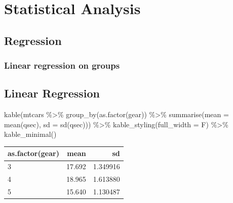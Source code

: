\documentclass[
]{article}
\newenvironment{Shaded}{\begin{snugshade}}{\end{snugshade}}
\newcommand{\AttributeTok}[1]{\textcolor[rgb]{0.77,0.63,0.00}{#1}}
\newcommand{\FunctionTok}[1]{\textcolor[rgb]{0.00,0.00,0.00}{#1}}
\newcommand{\NormalTok}[1]{#1}
\newcommand{\SpecialCharTok}[1]{\textcolor[rgb]{0.00,0.00,0.00}{#1}}
\begin{document}
\hypertarget{statistical-analysis}{%
\section{Statistical Analysis}\label{statistical-analysis}}

\hypertarget{regression}{%
\subsection{Regression}\label{regression}}

\hypertarget{linear-regression-on-groups}{%
\subsubsection{Linear regression on groups}\label{linear-regression-on-groups}}

\hypertarget{linear-regression}{%
\subsection{Linear Regression}\label{linear-regression}}

\begin{Shaded}
\begin{Highlighting}[]
\FunctionTok{kable}\NormalTok{(mtcars }\SpecialCharTok{\%\textgreater{}\%}  \FunctionTok{group\_by}\NormalTok{(}\FunctionTok{as.factor}\NormalTok{(gear)) }\SpecialCharTok{\%\textgreater{}\%}
\FunctionTok{summarise}\NormalTok{(}\AttributeTok{mean =} \FunctionTok{mean}\NormalTok{(qsec), }\AttributeTok{sd =} \FunctionTok{sd}\NormalTok{(qsec))) }\SpecialCharTok{\%\textgreater{}\%}
  \FunctionTok{kable\_styling}\NormalTok{(}\AttributeTok{full\_width =}\NormalTok{ F) }\SpecialCharTok{\%\textgreater{}\%}
  \FunctionTok{kable\_minimal}\NormalTok{()}
\end{Highlighting}
\end{Shaded}

\begin{table}
\centering
\begin{tabular}{l|r|r}
\hline
as.factor(gear) & mean & sd\\
\hline
3 & 17.692 & 1.349916\\
\hline
4 & 18.965 & 1.613880\\
\hline
5 & 15.640 & 1.130487\\
\hline
\end{tabular}
\end{table}
\end{document}
